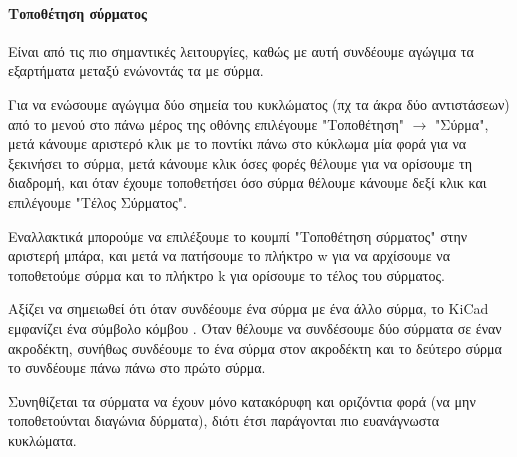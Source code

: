 \documentclass[a4paper]{article}
\begin{document}
\paragraph{Τοποθέτηση σύρματος}
Είναι από τις πιο σημαντικές λειτουργίες, καθώς με αυτή συνδέουμε αγώγιμα τα εξαρτήματα μεταξύ ενώνοντάς τα με σύρμα.

Για να ενώσουμε αγώγιμα δύο σημεία του κυκλώματος (πχ τα άκρα δύο αντιστάσεων) από το μενού στο πάνω μέρος της οθόνης επιλέγουμε "Τοποθέτηση" $\rightarrow$ "Σύρμα", μετά κάνουμε αριστερό κλικ με το ποντίκι πάνω στο κύκλωμα μία φορά για να ξεκινήσει το σύρμα, μετά κάνουμε κλικ όσες φορές θέλουμε για να ορίσουμε τη διαδρομή, και όταν έχουμε τοποθετήσει όσο σύρμα θέλουμε κάνουμε δεξί κλικ και επιλέγουμε "Τέλος Σύρματος". 

Εναλλακτικά μπορούμε να επιλέξουμε το κουμπί "Τοποθέτηση σύρματος" %
στην αριστερή μπάρα, και μετά να πατήσουμε το πλήκτρο w για να αρχίσουμε να τοποθετούμε σύρμα και το πλήκτρο k για ορίσουμε το τέλος του σύρματος.

Αξίζει να σημειωθεί ότι όταν συνδέουμε ένα σύρμα με ένα άλλο σύρμα, το \textenglish{KiCad} εμφανίζει ένα σύμβολο κόμβου %
. Όταν θέλουμε να συνδέσουμε δύο σύρματα σε έναν ακροδέκτη, συνήθως συνδέουμε το ένα σύρμα στον ακροδέκτη και το δεύτερο σύρμα το συνδέουμε πάνω πάνω στο πρώτο σύρμα.

Συνηθίζεται τα σύρματα να έχουν μόνο κατακόρυφη και οριζόντια φορά (να μην τοποθετούνται διαγώνια δύρματα), διότι έτσι παράγονται πιο ευανάγνωστα κυκλώματα.

\begin{figure}
  \begin{center}
    \label{fig:kicad-main}
  \end{center}
\end{figure}

\begin{figure}
  \begin{center}
    \label{fig:kicad-main}
  \end{center}
\end{figure}
   
\begin{figure}
  \begin{center}
    \label{fig:kicad-main}
  \end{center}
\end{figure}
\end{document}
